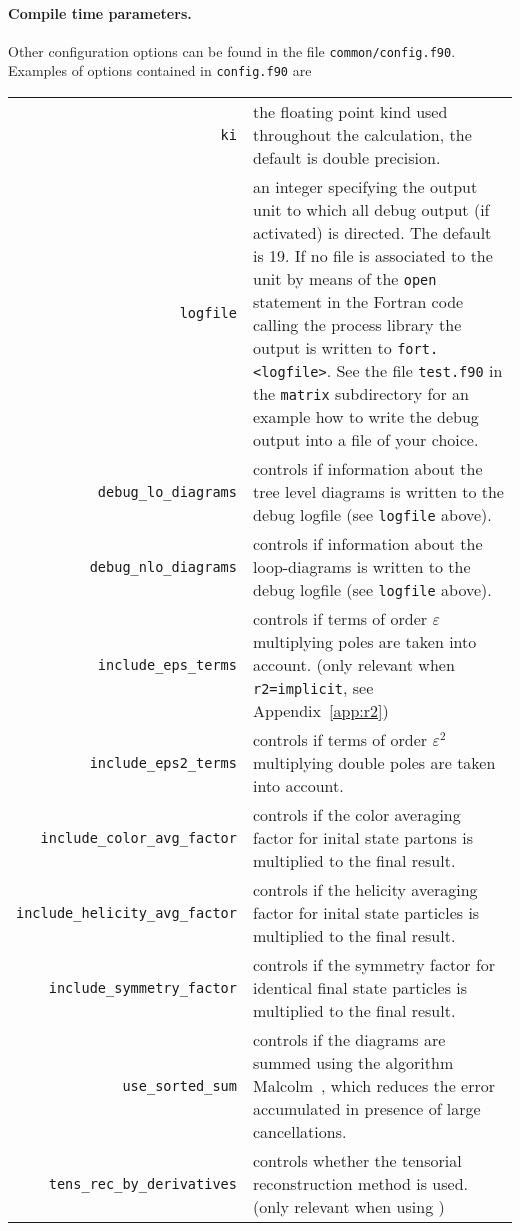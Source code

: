 \paragraph{Compile time parameters.}
Other configuration options can be found in the file \texttt{common/config.f90}.
\smallskip
Examples of options contained in \texttt{config.f90} are

\begin{longtable}{r p{}}
\texttt{ki} & the floating point kind used throughout the calculation, the default is double precision.\\
\texttt{logfile} & an integer specifying the output unit to which all debug output (if activated) is directed. The default is 19. If no file is associated to the unit by means of the \texttt{open} statement in the Fortran code calling the process library the output is written to \texttt{fort.<logfile>}. See the file \texttt{test.f90} in the \texttt{matrix} subdirectory for an example how to write the debug output into a file of your choice.\\
\texttt{debug\_lo\_diagrams} & controls if information about the
    tree level diagrams is written to the debug logfile (see \texttt{logfile} above).\\
\texttt{debug\_nlo\_diagrams} & controls if information about the
    loop-diagrams is written to the debug logfile (see \texttt{logfile} above).\\
\texttt{include\_eps\_terms} & controls if
    terms of order $\varepsilon$ multiplying
    poles are taken into account. (only relevant when \texttt{r2=implicit}, see Appendix~\ref{app:r2})\\
\texttt{include\_eps2\_terms} & controls if
    terms of order $\varepsilon^2$ multiplying
    double poles are taken into account.\\
\texttt{include\_color\_avg\_factor} & controls if the color averaging
    factor for inital state partons is multiplied to the final result.\\
\texttt{include\_helicity\_avg\_factor} & controls if the helicity averaging
    factor for inital state particles is multiplied to the final result.\\
\texttt{include\_symmetry\_factor} & controls if the symmetry
    factor for identical final state particles
    is multiplied to the final result. \\
\texttt{use\_sorted\_sum} & controls if the diagrams are summed using
    the algorithm Malcolm~\cite{Malcolm:1970}, which reduces the error
    accumulated in presence of large cancellations.\\
\texttt{tens\_rec\_by\_derivatives} & controls whether the tensorial reconstruction method is used. (only relevant when using \golemVC{})
\end{longtable}

